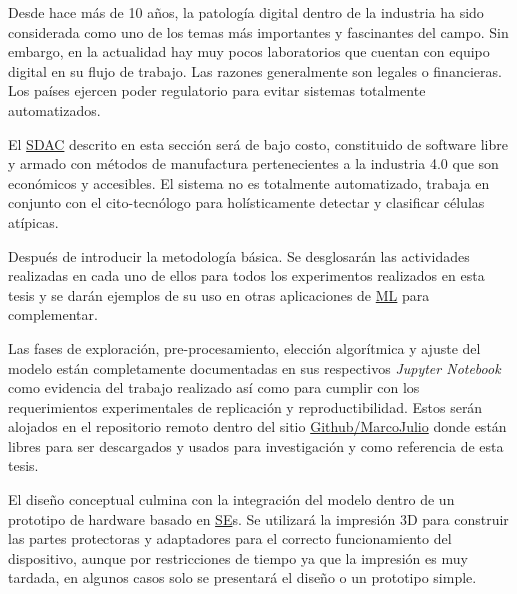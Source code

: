 Desde hace más de 10 años, la patología digital dentro de la industria ha sido
considerada como uno de los temas más importantes y fascinantes del campo. Sin
embargo, en la actualidad hay muy pocos laboratorios que cuentan con equipo
digital en su flujo de trabajo. Las razones generalmente son legales o
financieras. Los países ejercen poder regulatorio para evitar sistemas
totalmente automatizados.

El \hyperlink{abbr}{SDAC} descrito en esta sección será de bajo costo,
constituido de software libre y armado con métodos de manufactura pertenecientes
a la industria 4.0 que son económicos y accesibles. El sistema no es totalmente
automatizado, trabaja en conjunto con el cito-tecnólogo para holísticamente
detectar y clasificar células atípicas.

Después de introducir la metodología básica. Se desglosarán las actividades
realizadas en cada uno de ellos para todos los experimentos realizados en esta
tesis y se darán ejemplos de su uso en otras aplicaciones de
\hyperlink{abbr}{ML} para complementar.

Las fases de exploración, pre-procesamiento, elección algorítmica y ajuste del
modelo están completamente documentadas en sus respectivos \emph{Jupyter
Notebook} como evidencia del trabajo realizado así como para cumplir con los
requerimientos experimentales de replicación y reproductibilidad. Estos serán
alojados en el repositorio remoto dentro del sitio
\hyperlink{https://github.com/marcojulioarg/ConvoPap}{Github/MarcoJulio} donde
están libres para ser descargados y usados para investigación y como referencia
de esta tesis.

El diseño conceptual culmina con la integración del modelo dentro de un
prototipo de hardware basado en \hyperlink{abbr}{SE}s. Se utilizará la impresión
3D para construir las partes protectoras y adaptadores para el correcto
funcionamiento del dispositivo, aunque por restricciones de tiempo ya que la
impresión es muy tardada, en algunos casos solo se presentará el diseño o un
prototipo simple.